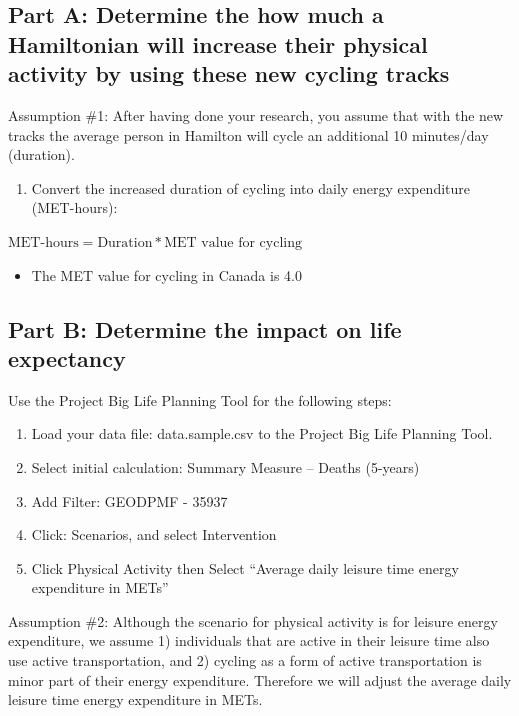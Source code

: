 \documentclass[]{book}
\providecommand{\tightlist}{%
  \setlength{\itemsep}{0pt}\setlength{\parskip}{0pt}}
\begin{document}
\subsection{Part A: Determine the how much a Hamiltonian will increase
their physical activity by using these new cycling
tracks}\label{part-a-determine-the-how-much-a-hamiltonian-will-increase-their-physical-activity-by-using-these-new-cycling-tracks}

Assumption \#1: After having done your research, you assume that with
the new tracks the average person in Hamilton will cycle an additional
10 minutes/day (duration).

\begin{enumerate}
\def\labelenumi{\arabic{enumi}.}
\tightlist
\item
  Convert the increased duration of cycling into daily energy
  expenditure (MET-hours):
\end{enumerate}

\(\text{MET-hours} = \text{Duration}*\text{MET value for cycling}\)

\begin{itemize}
\tightlist
\item
  The MET value for cycling in Canada is 4.0
\end{itemize}

\subsection{Part B: Determine the impact on life
expectancy}\label{part-b-determine-the-impact-on-life-expectancy}

Use the Project Big Life Planning Tool for the following steps:

\begin{enumerate}
\def\labelenumi{\arabic{enumi}.}
\item
  Load your data file: data.sample.csv to the Project Big Life Planning
  Tool.
\item
  Select initial calculation: Summary Measure -- Deaths (5-years)
\item
  Add Filter: GEODPMF - 35937
\item
  Click: Scenarios, and select Intervention
\item
  Click Physical Activity then Select ``Average daily leisure time
  energy expenditure in METs''
\end{enumerate}

Assumption \#2: Although the scenario for physical activity is for
leisure energy expenditure, we assume 1) individuals that are active in
their leisure time also use active transportation, and 2) cycling as a
form of active transportation is minor part of their energy expenditure.
Therefore we will adjust the average daily leisure time energy
expenditure in METs.
\end{document}
